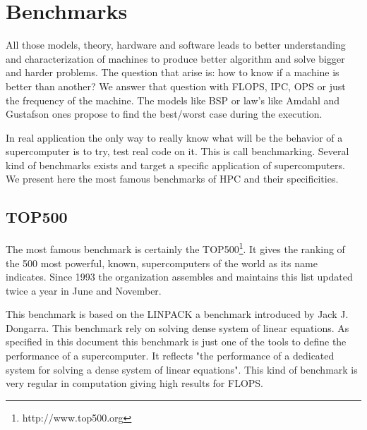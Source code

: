
\section{Benchmarks}
All those models, theory, hardware and software leads to better understanding and characterization of machines to produce better algorithm and solve bigger and harder problems. 
The question that arise is: how to know if a machine is better than another? 
We answer that question with FLOPS, IPC, OPS or just the frequency of the machine. 
The models like BSP or law's like Amdahl and Gustafson ones propose to find the best/worst case during the execution.

In real application the only way to really know what will be the behavior of a supercomputer is to try, test real code on it. 
This is call benchmarking.
Several kind of benchmarks exists and target a specific application of supercomputers. 
We present here the most famous benchmarks of HPC and their specificities.

\subsection{TOP500}
The most famous benchmark is certainly the TOP500\footnote{http://www.top500.org}. 
It gives the ranking of the 500 most powerful, known, supercomputers of the world as its name indicates.
Since 1993 the organization assembles and maintains this list updated twice a year in June and November.

This benchmark is based on the LINPACK\cite{dongarra1994top500} a benchmark introduced by Jack J. Dongarra.
This benchmark rely on solving  dense system of linear equations. 
As specified in this document this benchmark is just one of the tools to define the performance of a supercomputer. 
It reflects "the performance of a dedicated system for solving a dense system of linear equations".
This kind of benchmark is very regular in computation giving high results for FLOPS. 

